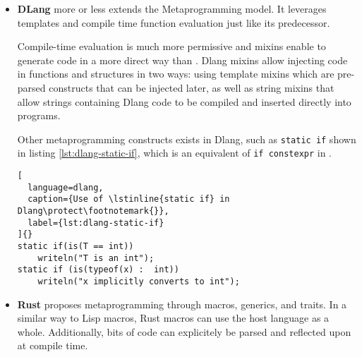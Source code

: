 \documentclass[../main]{subfiles}
\begin{document}
\begin{itemize}
Listing \ref{lst:metaocaml-spower} shows an example of runtime specialization
of a power function called \lstinline{spowern}. It takes an integer $N$
as an input, and returns a function that calculates the $N^{th}$ power
of its single input parameter.

\begin{lstlisting}[
  language=caml,
  caption={Run-time specialization of the power function in MetaOCaml\protect\footnotemark{}},
  label={lst:metaocaml-spower}
]{}
let rec spower : int -> int code -> int code =
  fun n x ->
    if n = 0 then .<1>.
    else if n mod 2 = 0
      then .< square .~(spower (n/2) x) >.
      else .<.~x * .~(spower (n-1) x)>.

let spowern : int -> (int -> int) code =
   fun n -> .<fun x -> .~(spower n .<x>.)>.;;
\end{lstlisting}

\item
\textbf{DLang} more or less extends the \cpp Metaprogramming model.
It leverages templates and compile time function evaluation just like
its predecessor.

Compile-time evaluation is much more permissive and mixins enable to generate
code in a more direct way than \cpp. Dlang mixins allow injecting code in
functions and structures in two ways: using template mixins
which are pre-parsed constructs that can be injected later,
as well as string mixins that allow strings containing Dlang code
to be compiled and inserted directly into programs.

Other metaprogramming constructs exists in Dlang, such as \lstinline{static if}
shown in listing \ref{lst:dlang-static-if}, which is an equivalent of
\lstinline{if constexpr} in \cpp.

\begin{lstlisting}[
  language=dlang,
  caption={Use of \lstinline{static if} in Dlang\protect\footnotemark{}},
  label={lst:dlang-static-if}
]{}
static if(is(T == int))
    writeln("T is an int");
static if (is(typeof(x) :  int))
    writeln("x implicitly converts to int");
\end{lstlisting}

\item
\textbf{Rust} proposes metaprogramming through macros, generics, and traits.
In a similar way to Lisp macros, Rust macros can use the host language
as a whole. Additionally, bits of code can explicitely be parsed and reflected
upon at compile time.


\end{itemize}
\end{document}
